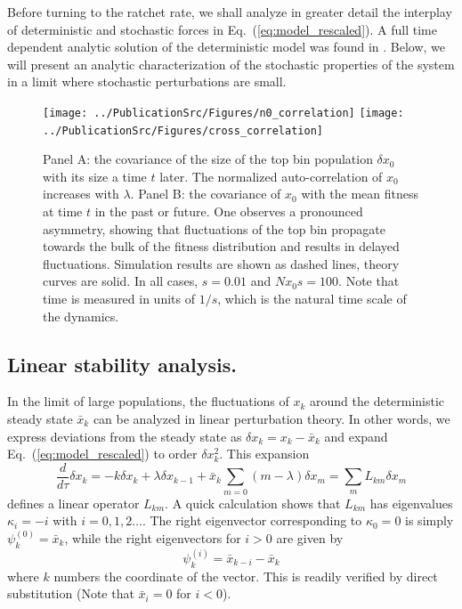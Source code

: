 \documentclass[rmp,preprint]{revtex4}
\newcommand{\EQ}[1]{Eq.~(\ref{eq:#1})}
\newcommand{\x}{x}
\newcommand{\xs}{\bar{\x}}
\newcommand{\dx}{\delta \x}
\newcommand{\mr}[1]{\psi^{(#1)}}
\begin{document}
Before turning to the ratchet rate, we shall analyze in greater detail the interplay of deterministic and stochastic forces in \EQ{model_rescaled}. A full time dependent analytic solution of the deterministic model was found in \citep{Etheridge:2007p44291}. Below, we will present an analytic characterization of the stochastic properties of the system in a limit where stochastic perturbations are small. 


\begin{figure}[htb]
\begin{center}
  \texttt{[image: ../PublicationSrc/Figures/n0\_correlation]}
  \texttt{[image: ../PublicationSrc/Figures/cross\_correlation]}
  \caption[labelInTOC]{Panel A: the covariance of the size of the top bin population $\dx_0$ with its size a time $t$ later. The normalized auto-correlation of $\x_0$ increases with $\lambda$. Panel B: the covariance of $\x_0$ with the mean fitness at time $t$ in the past or future. One observes a pronounced asymmetry, showing that fluctuations of the top bin propagate towards the bulk of the fitness distribution and results in delayed fluctuations. Simulation results are shown as dashed lines, theory curves are solid. In all cases, $s=0.01$ and $N\x_0 s=100$. Note that time is measured in units of $1/s$, which is the natural time scale of the dynamics. }
  \label{fig:correlation_functions}
\end{center}
\end{figure}


\subsection*{Linear stability analysis.} %
In the limit of large populations, the fluctuations of $\x_k$ around the deterministic steady state $\xs_k$ can be analyzed in linear perturbation theory. In other words, we express deviations from the steady state as $\dx_k =\x_k -\xs_k$ and expand \EQ{model_rescaled} to  order $\dx_k^2$. This expansion
\begin{equation}
\label{eq:linear}
\frac{d}{d\tau} \dx_k= -k \dx_k +\lambda \dx_{k-1}+\xs_k\sum_{m=0} (m-\lambda)\dx_m = \sum_m L_{km}\dx_m
\end{equation}
defines a linear operator $L_{km}$. A quick calculation shows that $L_{km}$ has eigenvalues $\kappa_i = -i$ with $i=0, 1, 2\ldots$. The right eigenvector corresponding to $\kappa_0=0$ is simply $\mr{0}_k = \xs_k$, while the right eigenvectors for $i>0$ are given by 
\begin{equation}
\label{eq:eigenmodes}
\mr{i}_k=\xs_{k-i} - \xs_{k}
\end{equation}
where $k$ numbers the coordinate of the vector. This is readily verified by direct substitution (Note that $\xs_{i}=0$ for $i<0$).
\end{document}
